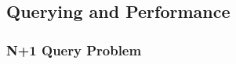 \subsection[Querying and Performance]{Querying and Performance}

\subsubsection[N+1 Query Problem]{N+1 Query Problem}

